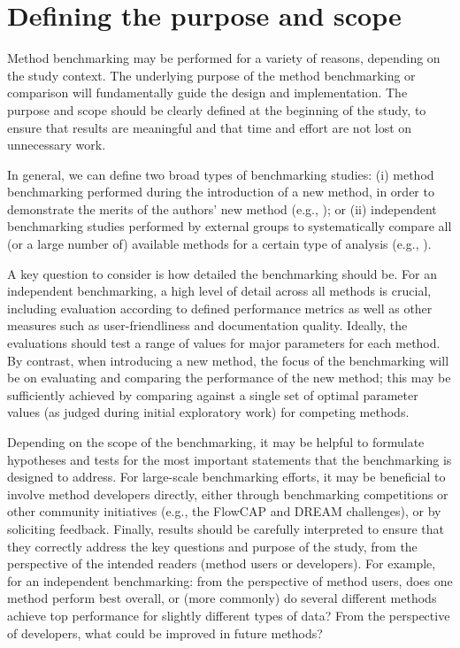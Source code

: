 \documentclass[12pt, a4paper]{article}
\begin{document}
\section*{Defining the purpose and scope}

Method benchmarking may be performed for a variety of reasons, depending on the study context. The underlying purpose of the method benchmarking or comparison will fundamentally guide the design and implementation. The purpose and scope should be clearly defined at the beginning of the study, to ensure that results are meaningful and that time and effort are not lost on unnecessary work.

In general, we can define two broad types of benchmarking studies: (i) method benchmarking performed during the introduction of a new method, in order to demonstrate the merits of the authors' new method (e.g., \citep{Weber2018, Nowicka2016, Levine2015, Zhou2014, Law2014}); or (ii) independent benchmarking studies performed by external groups to systematically compare all (or a large number of) available methods for a certain type of analysis (e.g., \citep{Saelens2018a, Saelens2018b, Duo2018, Soneson2018, Weber2016}).

A key question to consider is how detailed the benchmarking should be. For an independent benchmarking, a high level of detail across all methods is crucial, including evaluation according to defined performance metrics as well as other measures such as user-friendliness and documentation quality. Ideally, the evaluations should test a range of values for major parameters for each method. By contrast, when introducing a new method, the focus of the benchmarking will be on evaluating and comparing the performance of the new method; this may be sufficiently achieved by comparing against a single set of optimal parameter values (as judged during initial exploratory work) for competing methods.

Depending on the scope of the benchmarking, it may be helpful to formulate hypotheses and tests for the most important statements that the benchmarking is designed to address. For large-scale benchmarking efforts, it may be beneficial to involve method developers directly, either through benchmarking competitions or other community initiatives (e.g., the FlowCAP \citep{Aghaeepour2013, Aghaeepour2016} and DREAM \citep{Eduati2015} challenges), or by soliciting feedback. Finally, results should be carefully interpreted to ensure that they correctly address the key questions and purpose of the study, from the perspective of the intended readers (method users or developers). For example, for an independent benchmarking: from the perspective of method users, does one method perform best overall, or (more commonly) do several different methods achieve top performance for slightly different types of data? From the perspective of developers, what could be improved in future methods?
\end{document}
